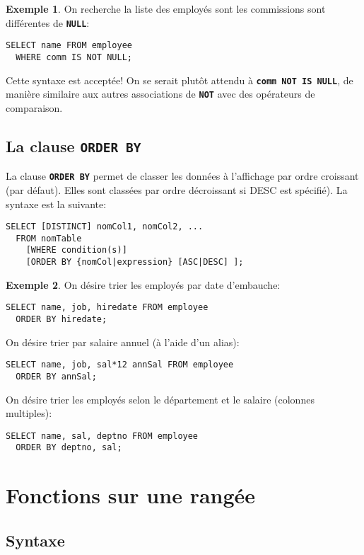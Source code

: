 \documentclass[a4paper, 12pt]{report}
\newcommand{\textSQL}[1]{\texttt{\textbf{#1}}}
\theoremstyle{definition} \newtheorem{ex}{Exemple}
\begin{document}
\begin{ex}
On recherche la liste des employés sont les commissions sont différentes de \textSQL{NULL}:
	\begin{lstlisting}[frame=single]
SELECT name FROM employee
  WHERE comm IS NOT NULL;
  \end{lstlisting}
Cette syntaxe est acceptée! On se serait plutôt attendu à \textSQL{comm NOT IS NULL}, de manière similaire aux autres associations de \textSQL{NOT} avec des opérateurs de comparaison.
\end{ex}


\section{La clause \textSQL{ORDER BY}}
La clause \textSQL{ORDER BY} permet de classer les données à l'affichage par ordre croissant (par défaut). Elles sont classées par ordre décroissant si DESC est spécifié). La syntaxe est la suivante:
\begin{lstlisting}[frame=single]
SELECT [DISTINCT] nomCol1, nomCol2, ...
  FROM nomTable
	[WHERE condition(s)]
	[ORDER BY {nomCol|expression} [ASC|DESC] ];
\end{lstlisting}
\begin{ex}
On désire trier les employés par date d'embauche:
	\begin{lstlisting}[frame=single]
SELECT name, job, hiredate FROM employee
  ORDER BY hiredate;
\end{lstlisting}
On désire trier par salaire annuel (à l'aide d'un alias):
	\begin{lstlisting}[frame=single]
SELECT name, job, sal*12 annSal FROM employee
  ORDER BY annSal;
\end{lstlisting}
On désire trier  les employés selon le département et le salaire (colonnes multiples):
	\begin{lstlisting}[frame=single]
SELECT name, sal, deptno FROM employee
  ORDER BY deptno, sal;
\end{lstlisting}
\end{ex}

\chapter{Fonctions sur une rangée}

\section{Syntaxe}
\end{document}
